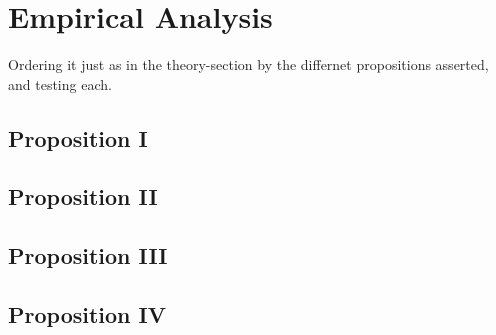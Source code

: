 \chapter{Empirical Analysis}
\label{chap:empirical_analysis}
Ordering it just as in the theory-section by the differnet propositions asserted, and testing each.

\section{Proposition I}
\label{sec:analysis_prop_1}
%


\section{Proposition II}
\label{sec:analysis_prop_2}


\section{Proposition III}
\label{sec:analysis_prop_3}


\section{Proposition IV}
\label{sec:analysis_prop_4}
